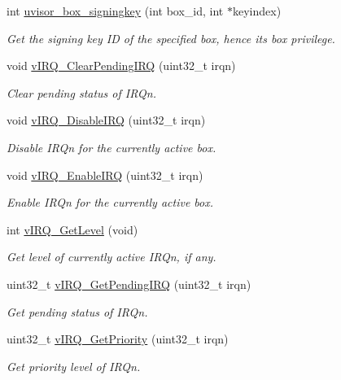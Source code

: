 \begin{DoxyCompactItemize}
int \hyperlink{group__hypervisor_ga82e5cbff1a1a26974ed1e5f493607cf2}{uvisor\+\_\+box\+\_\+signingkey} (int box\+\_\+id, int $\ast$keyindex)
\begin{DoxyCompactList}\small\item\em Get the signing key ID of the specified box, hence its box privilege. \end{DoxyCompactList}\item 
void \hyperlink{group__hypervisor_gaa02ff863ab222f97723b60e59f6d92d8}{v\+I\+R\+Q\+\_\+\+Clear\+Pending\+I\+RQ} (uint32\+\_\+t irqn)
\begin{DoxyCompactList}\small\item\em Clear pending status of I\+R\+Qn. \end{DoxyCompactList}\item 
void \hyperlink{group__hypervisor_ga7beb8d1fe68378367bcb8085a2d16cd5}{v\+I\+R\+Q\+\_\+\+Disable\+I\+RQ} (uint32\+\_\+t irqn)
\begin{DoxyCompactList}\small\item\em Disable I\+R\+Qn for the currently active box. \end{DoxyCompactList}\item 
void \hyperlink{group__hypervisor_ga3dd01fda80a57db36a78994d0cae91ee}{v\+I\+R\+Q\+\_\+\+Enable\+I\+RQ} (uint32\+\_\+t irqn)
\begin{DoxyCompactList}\small\item\em Enable I\+R\+Qn for the currently active box. \end{DoxyCompactList}\item 
int \hyperlink{group__hypervisor_ga880e3229f62cfff1c638c5dd6a1e9050}{v\+I\+R\+Q\+\_\+\+Get\+Level} (void)
\begin{DoxyCompactList}\small\item\em Get level of currently active I\+R\+Qn, if any. \end{DoxyCompactList}\item 
uint32\+\_\+t \hyperlink{group__hypervisor_gad450b31ead2ec4f7bb2dbe07ebcfd8e7}{v\+I\+R\+Q\+\_\+\+Get\+Pending\+I\+RQ} (uint32\+\_\+t irqn)
\begin{DoxyCompactList}\small\item\em Get pending status of I\+R\+Qn. \end{DoxyCompactList}\item 
uint32\+\_\+t \hyperlink{group__hypervisor_ga3da0be917ac42157f0d33e3e1412379b}{v\+I\+R\+Q\+\_\+\+Get\+Priority} (uint32\+\_\+t irqn)
\begin{DoxyCompactList}\small\item\em Get priority level of I\+R\+Qn. \end{DoxyCompactList}\item 

\end{DoxyCompactItemize}
